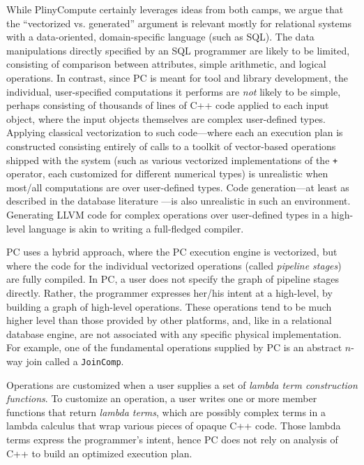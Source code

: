 While PlinyCompute certainly leverages ideas from both camps, we argue that the ``vectorized vs. generated'' argument is relevant mostly for 
relational systems with a data-oriented, domain-specific language (such as SQL).  
The data manipulations directly specified by an SQL programmer are likely to be limited, 
consisting of comparison between attributes, simple arithmetic, and logical operations.
In contrast, since PC is meant for tool
and library development, the individual, user-specified
computations it performs are \emph{not} likely to be simple, perhaps consisting of thousands of lines of 
C++ code applied to each input object, where the input objects themselves are complex user-defined types.  
Applying classical vectorization to such code---where each an execution plan is constructed consisting entirely of calls to a toolkit of
vector-based operations shipped with the system (such as various vectorized implementations of the \texttt{+} operator, each customized for different numerical
types) is unrealistic when most/all computations are over user-defined types.  Code generation---at least as described in the database literature \cite{}---is also
unrealistic in such an environment.  Generating LLVM code for complex operations over user-defined types 
in a high-level language 
is akin to writing a full-fledged compiler. 

PC uses a hybrid approach, where the PC execution engine is vectorized, but where the code for the individual vectorized operations (called \emph{pipeline stages})
are fully compiled.  
In PC, a user does not specify the graph of pipeline stages directly.  Rather,
the programmer expresses her/his intent at a high-level, by building a graph of high-level operations.  These operations tend to be much higher
level than those provided by other platforms, and, like in a relational database engine, are not associated with any specific 
physical implementation.
For example, one of the fundamental operations supplied by PC is an abstract $n$-way join called a \texttt{JoinComp}.

Operations are customized when a user supplies a set of 
\emph{lambda term
construction functions}.  To customize an operation, a user writes one or more member functions
that return \emph{lambda terms}, which are possibly complex terms in a lambda calculus that 
wrap various pieces of opaque C++ code.  Those lambda terms express the programmer's intent, hence PC does not rely on analysis of C++ to build an optimized
execution plan.

